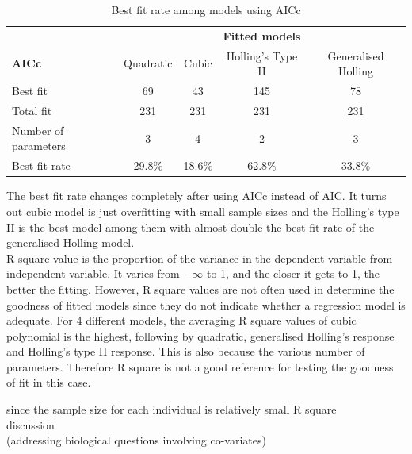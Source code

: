 \documentclass{article}[11pt,a4,twosided,doublespacing,titlepagenumber=on,numbers=endperiod]
\begin{document}
\begin{table}[H]
\centering 
\begin{tabular}{l c c c c}
\toprule %
& \multicolumn{4}{c}{\textbf{Fitted models}} \\
\cmidrule(l){2-5}
\textbf{AICc} & Quadratic & Cubic & Holling's Type II & Generalised Holling\\ %
\midrule %
Best fit & 69 & 43 & 145 & 78\\ %
Total fit  & 231 & 231 & 231 & 231\\ %
Number of parameters & 3 & 4 & 2 & 3\\ %
\midrule %
\midrule %
Best fit rate & 29.8\% & 18.6\% & 62.8\% & 33.8\% \\ %
\bottomrule %
\end{tabular}
\caption{Best fit rate among models using AICc} %
\label{tab:template} %
\end{table}
\noindent
The best fit rate changes completely after using AICc instead of AIC. It turns out cubic model is just overfitting with small sample sizes and the Holling's type II is the best model among them with almost double the best fit rate of the generalised Holling model. \\
\noindent
R square value is the proportion of the variance in the dependent variable from independent variable. It varies from $-\infty$ to 1, and the closer it gets to 1, the better the fitting. However, R square values are not often used in determine the goodness of fitted models since they do not indicate whether a regression model is adequate. For 4 different models, the averaging R square values of cubic polynomial is the highest, following by quadratic, generalised Holling's response and Holling's type II response. This is also because the various number of parameters. Therefore R square is not a good reference for testing the goodness of fit in this case.





since the sample size for each individual is relatively small 
R square\\
discussion\\
(addressing biological questions involving co-variates)
\newpage

%
%
\renewcommand\refname{Bibliography}

\end{document}
